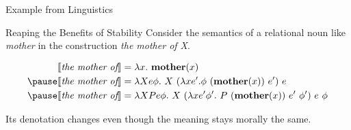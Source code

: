 \documentclass{beamer}
\newcommand{\sem}[1]{\llbracket #1 \rrbracket}
\newcommand{\semdom}[1]{\textbf{#1}}
\newcommand{\includepicture}[1]{
    \texttt{[image: dias/\#1.eps]}
}
\begin{document}
\begin{frame}{Example from Linguistics}
\end{frame}

\begin{frame}{Reaping the Benefits of Stability}
  Consider the semantics of a relational noun like \textit{mother} in the
  construction \textit{the mother of X}.

  \pause

  \begin{align*}
    \sem{\textit{the mother of}} &= \lambda x.\ \semdom{mother}(x) \\
    \pause
    \sem{\textit{the mother of}} &= \lambda X e \phi.\ X\ (\lambda x e'. \phi\ (\semdom{mother}(x))\ e')\ e \\
    \pause
    \sem{\textit{the mother of}} &= \lambda X P e \phi.\ X\ (\lambda x e' \phi'.\ P\ (\semdom{mother}(x))\ e'\ \phi')\ e\ \phi \\
  \end{align*}

  \pause

  Its denotation changes even though the meaning stays morally the same.
\end{frame}
\end{document}
